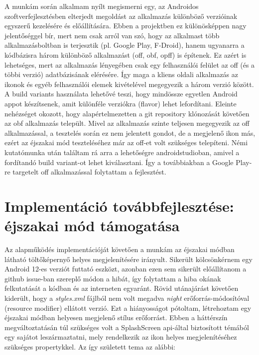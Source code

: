 A munkám során alkalmam nyílt megismerni egy, az Androidos szoftverfejlesztésben elterjedt
megoldást az alkalmazás különböző verzióinak egyszerű kezelésére és előállítására. Ebben a projektben ez
különösképpen nagy jelentőséggel bír, mert nem csak arról van szó, hogy az alkalmast több
alkalmazásboltban is terjesztik (pl. Google Play, F-Droid), hanem ugyanarra a kódbázisra
három különböző alkalmazást (\acrfull{off}, \acrfull{obf}, \acrfull{opff})
is építenek. Ez azért is lehetséges, mert az alkalmazás lényegében csak egy felhasználói felület
az \acrlong{off} (és a többi verzió) adatbázisának elérésére. Így maga a kliens oldali alkalmazás
az ikonok és egyéb felhasználói elemek kivételével megegyezik a három verzió között.
A build variants használata lehetővé teszi, hogy mindössze egyetlen Android appot
készítsenek, amit különféle verziókra (flavor) lehet lefordítani. Eleinte nehézséget okozott,
hogy alapértelmezetten a git repository klónozását követően az \acrlong{obf} alkalmazás
települt. Mivel az alkalmazás szinte teljesen megegyezik az \acrlong{off} alkalmazással, a
tesztelés során ez nem jelentett gondot, de a  megjelenő ikon más, ezért az éjszakai
mód teszteléséhez már az \acrlong{off}-et volt szükséges telepíteni. Némi kutatómunka után
találtam rá arra a lehetőségre \gls{androidstudio}ban, amivel a fordítandó build variant-ot lehet
kiválasztani. Így a továbbiakban a Google Play-re targetelt \acrlong{off} alkalmazással
folytattam a fejlesztést.

\section{Implementáció továbbfejlesztése: éjszakai mód támogatása}
Az alapműködés implementációját követően a munkám az éjszakai módban látható töltőképernyő helyes megjelenítésére irányult.
Sikerült kölcsönkérnem egy Android 12-es verziót futtató eszközt, azonban ezen sem sikerült
előállítanom a \gls{github} issue-ban \cite{issue} szereplő módon a hibát, így folytattam a hiba okának felkutatását
a kódban és az interneten egyaránt. Rövid utánajárást követően kiderült, hogy a
\textit{styles.xml} fájlból nem volt megadva \textit{night} erőforrás-módosítóval
(resource modifier) ellátott verzió. Ezt a hiányosságot pótoltam, létrehoztam egy éjszakai
módban helyesen megjelenő stílus erőforrást. Ebben a háttérszín megváltoztatásán túl szükséges
volt a SplashScreen \acrshort{api}-által biztosított témából egy sajátot leszármaztatni, mely rendelkezik
az ikon helyes megjelenítéséhez szükséges propertykkel. Az így született \gls{tema} az alábbi:

